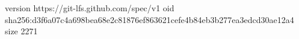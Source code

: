 version https://git-lfs.github.com/spec/v1
oid sha256:d3f6a07c4a698bea68e2c81876ef863621cefe4b84eb3b277ea3edcd30ae12a4
size 2271
